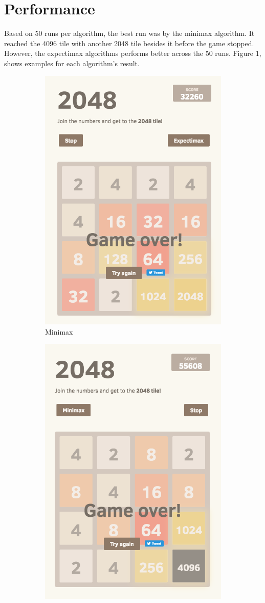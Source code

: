 \documentclass[english]{article}
\begin{document}
\section*{Performance}

Based on 50 runs per algorithm, the best run was by the minimax algorithm. It reached the 4096 tile with another 2048 tile besides it before the game stopped. However, the expectimax algorithms performs better across the 50 runs. Figure 1, shows examples for each algorithm's result.
\begin{figure}[H]
\centering
\begin{subfigure}{.5\textwidth}
  \centering
  \includegraphics[width=.7\linewidth]{2048.png}
  \caption{Minimax}
  \label{fig:sub1}
\end{subfigure}%
\begin{subfigure}{.5\textwidth}
  \centering
  \includegraphics[width=.7\linewidth]{4096.png}

\end{subfigure}
\end{figure}
\end{document}
